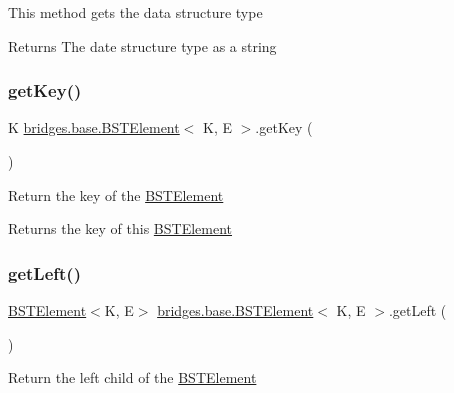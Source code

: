 This method gets the data structure type

\begin{DoxyReturn}{Returns}
The date structure type as a string 
\end{DoxyReturn}
\mbox{\label{classbridges_1_1base_1_1_b_s_t_element_afba950fad36d3327b01003df3ba4cc9f}} 
\subsubsection{\texorpdfstring{get\+Key()}{getKey()}}
{\footnotesize\ttfamily K \mbox{\hyperlink{classbridges_1_1base_1_1_b_s_t_element}{bridges.\+base.\+B\+S\+T\+Element}}$<$ K, E $>$.get\+Key (\begin{DoxyParamCaption}{ }\end{DoxyParamCaption})}

Return the key of the \mbox{\hyperlink{classbridges_1_1base_1_1_b_s_t_element}{B\+S\+T\+Element}}

\begin{DoxyReturn}{Returns}
the key of this \mbox{\hyperlink{classbridges_1_1base_1_1_b_s_t_element}{B\+S\+T\+Element}} 
\end{DoxyReturn}
\mbox{\label{classbridges_1_1base_1_1_b_s_t_element_a8abdd6e4a0486de7fa45fbb233b56688}} 
\subsubsection{\texorpdfstring{get\+Left()}{getLeft()}}
{\footnotesize\ttfamily \mbox{\hyperlink{classbridges_1_1base_1_1_b_s_t_element}{B\+S\+T\+Element}}$<$K, E$>$ \mbox{\hyperlink{classbridges_1_1base_1_1_b_s_t_element}{bridges.\+base.\+B\+S\+T\+Element}}$<$ K, E $>$.get\+Left (\begin{DoxyParamCaption}{ }\end{DoxyParamCaption})}

Return the left child of the \mbox{\hyperlink{classbridges_1_1base_1_1_b_s_t_element}{B\+S\+T\+Element}}

